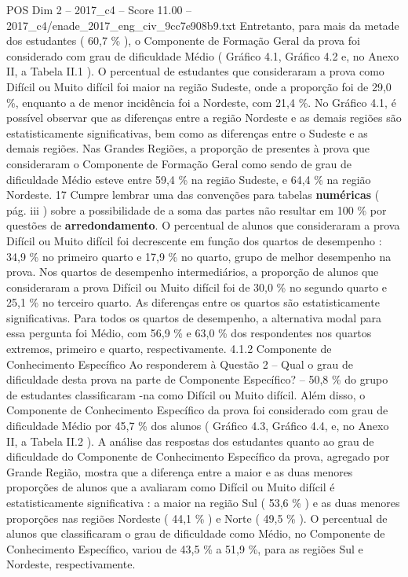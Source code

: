 \begin{textsample}{POS Dim 2 – 2017\_c4 – Score 11.00 – 2017\_c4/enade\_2017\_eng\_civ\_9cc7e908b9.txt}
Entretanto, para mais da metade dos estudantes ( 60,7 \% ), o Componente de Formação Geral da prova foi considerado com grau de dificuldade Médio ( Gráfico 4.1, Gráfico 4.2 e, no Anexo II, a Tabela II.1 ).
O percentual de estudantes que consideraram a prova como Difícil ou Muito difícil foi maior na região Sudeste, onde a proporção foi de 29,0 \%, enquanto a de menor incidência foi a Nordeste, com 21,4 \%.
No Gráfico 4.1, é possível observar que as diferenças entre a região Nordeste e as demais regiões são estatisticamente significativas, bem como as diferenças entre o Sudeste e as demais regiões.
Nas Grandes Regiões, a proporção de presentes à prova que consideraram o Componente de Formação Geral como sendo de grau de dificuldade Médio esteve entre 59,4 \% na região Sudeste, e 64,4 \% na região Nordeste. 17 Cumpre lembrar uma das convenções para tabelas \textbf{numéricas} ( pág. iii ) sobre a possibilidade de a soma das partes não resultar em 100 \% por questões de \textbf{arredondamento}.
O percentual de alunos que consideraram a prova Difícil ou Muito difícil foi decrescente em função dos quartos de desempenho : 34,9 \% no primeiro quarto e 17,9 \% no quarto, grupo de melhor desempenho na prova.
Nos quartos de desempenho intermediários, a proporção de alunos que consideraram a prova Difícil ou Muito difícil foi de 30,0 \% no segundo quarto e 25,1 \% no terceiro quarto.
As diferenças entre os quartos são estatisticamente significativas.
Para todos os quartos de desempenho, a alternativa modal para essa pergunta foi Médio, com 56,9 \% e 63,0 \% dos respondentes nos quartos extremos, primeiro e quarto, respectivamente. 4.1.2 Componente de Conhecimento Específico Ao responderem à Questão 2 – Qual o grau de dificuldade desta prova na parte de Componente Específico? – 50,8 \% do grupo de estudantes classificaram -na como Difícil ou Muito difícil.
Além disso, o Componente de Conhecimento Específico da prova foi considerado com grau de dificuldade Médio por 45,7 \% dos alunos ( Gráfico 4.3, Gráfico 4.4, e, no Anexo II, a Tabela II.2 ).
A análise das respostas dos estudantes quanto ao grau de dificuldade do Componente de Conhecimento Específico da prova, agregado por Grande Região, mostra que a diferença entre a maior e as duas menores proporções de alunos que a avaliaram como Difícil ou Muito difícil é estatisticamente significativa : a maior na região Sul ( 53,6 \% ) e as duas menores proporções nas regiões Nordeste ( 44,1 \% ) e Norte ( 49,5 \% ).
O percentual de alunos que classificaram o grau de dificuldade como Médio, no Componente de Conhecimento Específico, variou de 43,5 \% a 51,9 \%, para as regiões Sul e Nordeste, respectivamente.

\end{textsample}
